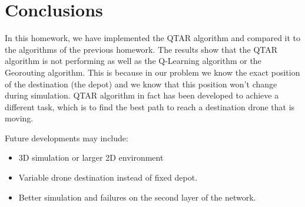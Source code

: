 \section{Conclusions}
In this homework, we have implemented the QTAR algorithm and compared it to the algorithms of the previous homework.
The results show that the QTAR algorithm is not performing as well as the Q-Learning algorithm or the Georouting algorithm.
This is because in our problem we know the exact position of the destination (the depot) and we know that this position won't change during simulation.
QTAR algorithm in fact has been developed to achieve a different task, which is to find the best path to reach a destination drone that is moving.

Future developments may include:
\begin{itemize}
    \item 3D simulation or larger 2D environment
    \item Variable drone destination instead of fixed depot.
    \item Better simulation and failures on the second layer of the network.
\end{itemize}